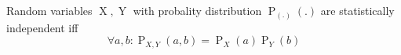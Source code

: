 Random variables $\operatorname{X}, \operatorname{Y}$ with probality distribution $\operatorname{P}_{(.)}(.)$ are statistically independent iff
$$\forall a, b : \operatorname{P}_{X,Y}(a, b) = \operatorname{P}_X(a) \operatorname{P}_Y(b)$$
